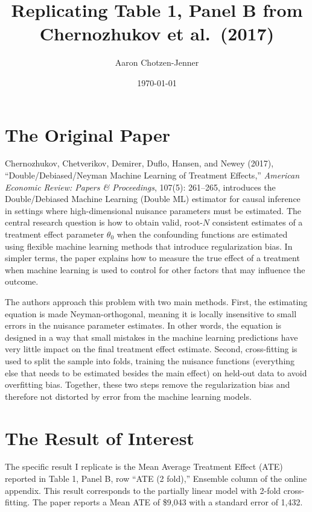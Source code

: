\documentclass[12pt]{article}
\title{Replicating Table 1, Panel B from\\Chernozhukov et al.\ (2017)}
\author{Aaron Chotzen-Jenner}
\date{\today}
\begin{document}
\maketitle

\section{The Original Paper}

Chernozhukov, Chetverikov, Demirer, Duflo, Hansen, and Newey (2017),
``Double/Debiased/Neyman Machine Learning of Treatment Effects,''
\textit{American Economic Review: Papers \& Proceedings}, 107(5): 261--265,
introduces the Double/Debiased Machine Learning (Double ML) estimator for
causal inference in settings where high-dimensional nuisance parameters must
be estimated. The central research question is how to obtain valid,
root-$N$ consistent estimates of a treatment effect parameter $\theta_0$
when the confounding functions are estimated using flexible machine learning
methods that introduce regularization bias. In simpler terms, the paper
explains how to measure the true effect of a treatment when machine learning
is used to control for other factors that may influence the outcome.

The authors approach this problem with two main methods. First, the
estimating equation is made Neyman-orthogonal, meaning it is locally
insensitive to small errors in the nuisance parameter estimates. In other
words, the equation is designed in a way that small mistakes in the machine
learning predictions have very little impact on the final treatment effect
estimate. Second, cross-fitting is used to split the sample into folds,
training the nuisance functions (everything else that needs to be estimated
besides the main effect) on held-out data to avoid overfitting bias.
Together, these two steps remove the regularization bias and therefore not
distorted by error from the machine learning models.

\section{The Result of Interest}

The specific result I replicate is the Mean Average Treatment Effect (ATE)
reported in Table 1, Panel B, row ``ATE (2 fold),'' Ensemble column of the
online appendix. This result corresponds to the partially linear model with
2-fold cross-fitting. The paper reports a Mean ATE of \$9,043 with a
standard error of 1,432.
\end{document}
